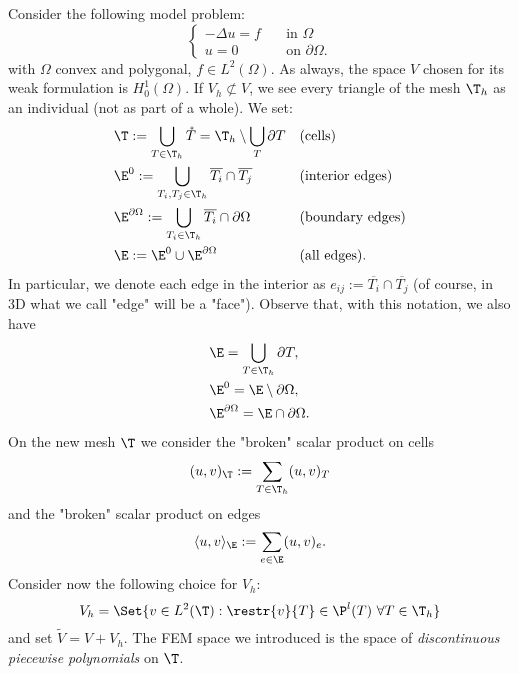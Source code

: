 Consider the following model problem:
\begin{equation}\label{eqn:poisson_1}
\begin{cases}
-\Delta u = f \quad &\text{in $\Omega$} \\
u = 0 \quad &\text{on $\partial\Omega$}.
\end{cases}
\end{equation}
with $\Omega$ convex and polygonal, $f\in L^2(\Omega)$. As always, the space $V$ chosen for its weak formulation is $H^1_0(\Omega)$. If $V_h \not\subset V$, we see every triangle of the mesh $\T_h$ as an individual (not as part of a whole). We set:
\begin{align}
&\T := \bigcup_{T \in \T_h} \mathring{T} = \T_h \setminus \bigcup_{T} \partial T && \text{(cells)} \\
&\E^0 := \bigcup_{T_i,T_j \in \T_h} \overline{T_i} \cap \overline{T_j} && \text{(interior edges)} \\
&\E^{\partial\Omega} := \bigcup_{T_i \in \T_h} \overline{T_i} \cap \partial\Omega && \text{(boundary edges)} \\
&\E := \E^0 \cup \E^{\partial\Omega} && \text{(all edges)}.
\end{align}
In particular, we denote each edge in the interior as $e_{ij} := \overline{T_i} \cap \overline{T_j}$ (of course, in 3D what we call "edge" will be a "face"). Observe that, with this notation, we also have
\begin{align}
&\E = \bigcup_{T \in \T_h} \partial T, \\
&\E^0 = \E \setminus \partial \Omega, \\
&\E^{\partial\Omega} = \E \cap \partial\Omega.
\end{align}
On the new mesh $\T$ we consider the "broken" scalar product on cells
\[
(u,v)_\T := \sum_{T \in \T_h} (u,v)_T
\]
and the "broken" scalar product on edges
\[
\langle u,v \rangle_\E := \sum_{e \in \E} (u,v)_e.
\]
Consider now the following choice for $V_h$:
\[
V_h = \Set{v \in L^2(\T) : \restr{v}{T} \in \P^l(T) \,\,\forall T \in \T_h}
\]
and set $\tilde{V} = V + V_h$. The FEM space we introduced is the space of \emph{discontinuous piecewise polynomials} on $\T$.

